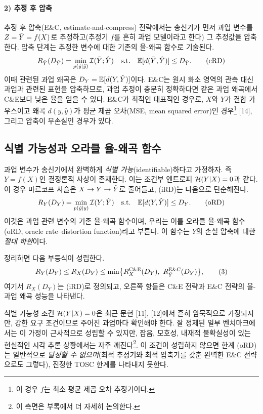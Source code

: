 \paragraph{2) 추정 후 압축}
추정 후 압축(E\&C, estimate-and-compress) 전략에서는 송신기가 먼저 과업 변수를 $Z=\tilde{Y}=f(X)$로 추정하고(추정기 $f$를 흔히 과업 모델이라고 한다) 그 추정값을 압축한다. 압축 단계는 추정한 변수에 대한 기존의 율-왜곡 함수로 기술된다.
\begin{equation}
R_{\tilde{Y}}(D_{\tilde{Y}})=\min_{p(\hat y|\tilde y)}\mathcal{I}(\tilde{Y};\hat{Y})\quad\text{s.t.}\quad \mathbb{E}[d(\tilde{Y},\hat{Y})]\le D_{\tilde{Y}}.\tag{eRD}
\end{equation}
이때 관련된 과업 왜곡은 $D_Y=\mathbb{E}[d(Y,\hat{Y})]$이다. E\&C는 원시 화소 영역의 관측 대신 과업과 관련된 표현을 압축하므로, 과업 추정이 충분히 정확하다면 같은 과업 왜곡에서 C\&E보다 낮은 율을 얻을 수 있다. E\&C가 최적인 대표적인 경우로, $X$와 $Y$가 결합 가우스이고 왜곡 $d(y,\hat y)$가 평균 제곱 오차(MSE, mean squared error)인 경우\footnote{이 경우 $f$는 최소 평균 제곱 오차 추정기이다.} [14], 그리고 압축이 무손실인 경우가 있다.

\subsection{식별 가능성과 오라클 율-왜곡 함수}
과업 변수가 송신기에서 완벽하게 \emph{식별 가능}(identifiable)하다고 가정하자. 즉 $Y=f(X)$인 결정론적 사상이 존재한다. 이는 조건부 엔트로피 $\mathcal{H}(Y|X)=0$과 같다. 이 경우 마르코프 사슬은 $X\to Y\to\hat{Y}$로 줄어들고, (iRD)는 다음으로 단순해진다.
\begin{equation}
R_Y(D_Y)=\min_{p(\hat y|y)}\mathcal{I}(Y;\hat{Y})\quad\text{s.t.}\quad \mathbb{E}[d(Y,\hat{Y})]\le D_Y.\tag{oRD}
\end{equation}
이것은 과업 관련 변수의 기존 율-왜곡 함수이며, 우리는 이를 오라클 율-왜곡 함수(oRD, oracle rate--distortion function)라고 부른다. 이 함수는 $Y$의 손실 압축에 대한 \emph{절대 하한}이다.

정리하면 다음 부등식이 성립한다.
\begin{equation}
R_Y(D_Y)\le R_X(D_Y)\le\min\bigl\{R_X^{\CE}(D_Y),\ R_{\Yt}^{\EC}(D_Y)\bigr\},\tag{3}
\end{equation}
여기서 $R_X(D_Y)$는 (iRD)로 정의되고, 오른쪽 항들은 C\&E 전략과 E\&C 전략의 율-과업 왜곡 성능을 나타낸다.

식별 가능성 조건 $\mathcal{H}(Y|X)=0$은 최근 문헌 [11], [12]에서 흔히 암묵적으로 가정되지만, 강한 요구 조건이므로 주어진 과업마다 확인해야 한다. 잘 정제된 일부 벤치마크에서는 이 가정이 근사적으로 성립할 수 있지만, 잡음, 모호성, 내재적 불확실성이 있는 현실적인 시각 추론 상황에서는 자주 깨진다\footnote{이 측면은 부록에서 더 자세히 논의한다.}. 이 조건이 성립하지 않으면 한계 (oRD)는 일반적으로 \emph{달성할 수 없으며}(최적 추정기와 최적 압축기를 갖춘 완벽한 E\&C 전략으로도 그렇다), 진정한 TOSC 한계를 나타내지 못한다.

